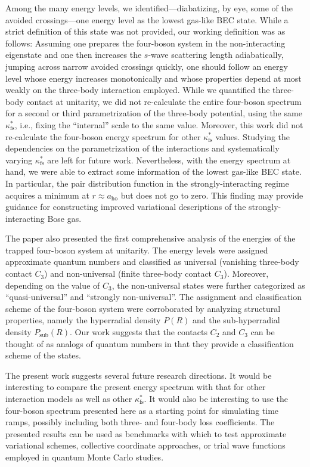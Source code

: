 \documentclass[aps,pra,twocolumn,showpacs,superscriptaddress]{revtex4}
\begin{document}
Among the many energy levels, we identified---diabatizing, by eye,
some of the avoided crossings---one energy level as the lowest
gas-like BEC state.
While a strict definition of this state was not provided,
our working definition was as follows: Assuming one prepares the
four-boson system in the non-interacting eigenstate and one then
increases the $s$-wave scattering length adiabatically,
jumping across narrow avoided crossings quickly,
one should follow an energy level whose energy increases
monotonically and whose properties depend at most weakly
on the three-body interaction employed.
While we quantified the three-body contact at unitarity, we did
not re-calculate the entire four-boson spectrum for a second or
third parametrization of the three-body potential,
using the same $\kappa^*_{\text{fs}}$, i.e., fixing the
``internal'' scale to the same value.
Moreover, this work did not re-calculate the four-boson
energy spectrum for other $\kappa^*_{\text{fs}}$ values.
Studying the dependencies on the parametrization of the
interactions and systematically varying $\kappa^*_{\text{fs}}$ are left
for future work.
Nevertheless, with the energy spectrum at hand, we were able
to extract some information of the lowest gas-like BEC state.
In particular, the pair distribution function in the strongly-interacting
regime acquires a minimum at $r \approx a_{\text{ho}}$ but
does not go to zero. This finding may provide guidance for
constructing improved variational descriptions
of the strongly-interacting Bose gas.

The paper also presented the first comprehensive analysis of
the energies of the trapped four-boson system at unitarity.
The energy levels were assigned approximate quantum numbers and
classified as universal (vanishing three-body contact $C_3$)
and non-universal (finite three-body contact $C_3$).
Moreover, depending on the value of $C_3$, the non-universal states
were further categorized as ``quasi-universal''
and ``strongly non-universal''.
The assignment and classification scheme
of the four-boson system were corroborated by
analyzing structural properties, namely the hyperradial density
$P(R)$ and the sub-hyperradial density
$P_{\text{sub}}(R)$.
Our work suggests that the contacts $C_2$ and $C_3$ can be thought of
as analogs of
quantum numbers in that they provide a classification scheme of the
states.

The present work suggests several future research directions.
It would be interesting to compare the present energy spectrum
with that for other interaction models as well as other
$\kappa^*_{\text{fs}}$.
It would also be interesting to use the four-boson spectrum
presented here as a starting point for simulating time ramps,
possibly including both three- and four-body loss coefficients.
The presented results can be used as benchmarks
with which to test approximate variational schemes,
collective coordinate approaches, or trial wave functions employed
in quantum Monte Carlo studies.
\end{document}
